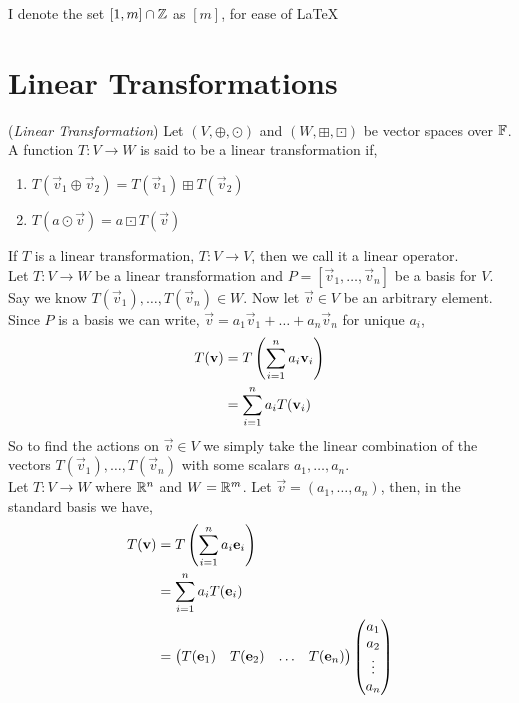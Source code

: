 \documentclass{article}
\begin{document}
\begin{notation}
  I denote the set $[1, m]\cap \mathbb{Z}$ as $[m]$, for ease of \LaTeX
\end{notation}

\section{Linear Transformations}

\begin{ndefi}{(\textit{Linear Transformation})}
  Let $(V, \oplus, \odot)$ and $(W, \boxplus, \boxdot)$ be vector spaces over $\mathbb{F}$. A function $T: V \to W$ is said to be a linear transformation if,
  \begin{enumerate}
    \item $T(\vec v_1 \oplus \vec v_2) = T(\vec v_1) \boxplus T(\vec v_2)$
    \item $T(a \odot \vec v) = a\boxdot T(\vec v)$
  \end{enumerate}
\end{ndefi}
If $T$ is a linear transformation, $T : V\to V$, then we call it a linear operator.\\

Let $T: V\to W$ be a linear transformation and $P = [\vec v_1,\dots, \vec v_n]$ be a basis for $V$. Say we know $T(\vec v_1), \dots, T(\vec v_n) \in W$. Now let $\vec v \in V$ be an arbitrary element. Since $P$ is a basis we can write, $\vec v = a_1\vec v_1 + \dots + a_n\vec v_n$ for unique $a_i$,
\begin{align*}
  T(\boldsymbol{\mathbf{v}}) &= T\left(\sum_{i=1}^n a_i\boldsymbol{\mathbf{v}}_i \right)\\
  &= \sum_{i=1}^n a_i T(\boldsymbol{\mathbf{v}}_i)
\end{align*}
So to find the actions on $\vec v\in V$ we simply take the linear combination of the vectors $T(\vec v_1), \dots, T(\vec v_n)$ with some scalars  $a_1,\dots, a_n$.\\

Let $T : V \to W$ where $\mathbb{R}^n$ and $W = \mathbb{R}^m$. Let $\vec v = (a_1,\dots, a_n)$, then, in the standard basis we have,
\begin{align*}
  T(\boldsymbol{\mathbf{v}}) &= T\left(\sum_{i=1}^n a_i \boldsymbol{\mathbf{e}}_i \right)\\
  &= \sum_{i=1}^n a_i T(\boldsymbol{\mathbf{e}}_i)\\
  &= \begin{pmatrix}
    T(\boldsymbol{\mathbf{e}}_1) & T(\boldsymbol{\mathbf{e}}_2) & \dots & T(\boldsymbol{\mathbf{e}}_n)\\
\end{pmatrix} \begin{pmatrix}
  a_1 \\ a_2 \\ \vdots \\ a_n
\end{pmatrix}
\end{align*}
\end{document}
